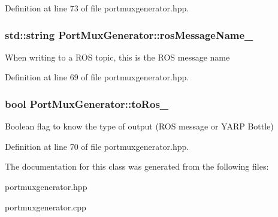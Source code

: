 Definition at line 73 of file portmuxgenerator.\-hpp.

\hypertarget{classPortMuxGenerator_a78f4039de899ad9af05bb7d72cf310b7}{
\subsubsection[{ros\-Message\-Name\-\_\-}]{\setlength{\rightskip}{0pt plus 5cm}std\-::string Port\-Mux\-Generator\-::ros\-Message\-Name\-\_\-\hspace{0.3cm}{\ttfamily [private]}}}\label{classPortMuxGenerator_a78f4039de899ad9af05bb7d72cf310b7}
When writing to a R\-O\-S topic, this is the R\-O\-S message name 

Definition at line 69 of file portmuxgenerator.\-hpp.

\hypertarget{classPortMuxGenerator_ada967c8c94e76a6b73598e77b039086b}{
\subsubsection[{to\-Ros\-\_\-}]{\setlength{\rightskip}{0pt plus 5cm}bool Port\-Mux\-Generator\-::to\-Ros\-\_\-\hspace{0.3cm}{\ttfamily [private]}}}\label{classPortMuxGenerator_ada967c8c94e76a6b73598e77b039086b}
Boolean flag to know the type of output (R\-O\-S message or Y\-A\-R\-P Bottle) 

Definition at line 70 of file portmuxgenerator.\-hpp.



The documentation for this class was generated from the following files\-:\begin{DoxyCompactItemize}
\item 
portmuxgenerator.\-hpp\item 
portmuxgenerator.\-cpp\end{DoxyCompactItemize}
